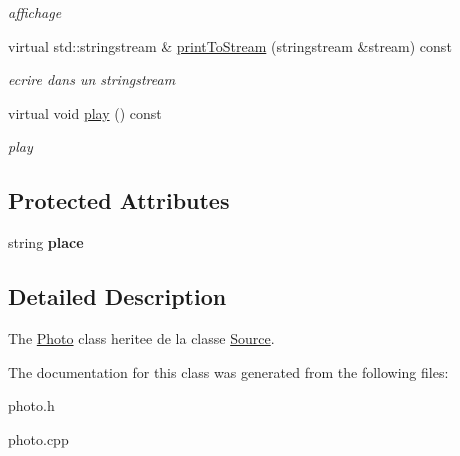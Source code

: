 \begin{DoxyCompactItemize}
\begin{DoxyCompactList}\small\item\em affichage \end{DoxyCompactList}\item 
\hypertarget{classPhoto_aea46b6547f584c315a5150637ebf5c36}{virtual std\-::stringstream \& \hyperlink{classPhoto_aea46b6547f584c315a5150637ebf5c36}{print\-To\-Stream} (stringstream \&stream) const }\label{classPhoto_aea46b6547f584c315a5150637ebf5c36}

\begin{DoxyCompactList}\small\item\em ecrire dans un stringstream \end{DoxyCompactList}\item 
\hypertarget{classPhoto_a34ef1c73e123d2951e8a08b3b1697c05}{virtual void \hyperlink{classPhoto_a34ef1c73e123d2951e8a08b3b1697c05}{play} () const }\label{classPhoto_a34ef1c73e123d2951e8a08b3b1697c05}

\begin{DoxyCompactList}\small\item\em play \end{DoxyCompactList}\end{DoxyCompactItemize}
\subsection*{Protected Attributes}
\begin{DoxyCompactItemize}
\item 
\hypertarget{classPhoto_aa5eebcbcc98061b25d054417e120c411}{string {\bfseries place}}\label{classPhoto_aa5eebcbcc98061b25d054417e120c411}

\end{DoxyCompactItemize}


\subsection{Detailed Description}
The \hyperlink{classPhoto}{Photo} class heritee de la classe \hyperlink{classSource}{Source}. 

The documentation for this class was generated from the following files\-:\begin{DoxyCompactItemize}
\item 
photo.\-h\item 
photo.\-cpp\end{DoxyCompactItemize}
